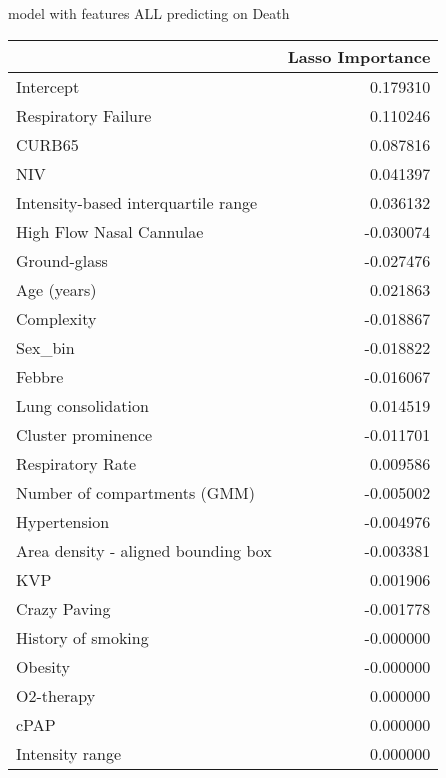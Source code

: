 model with features ALL predicting on Death\newline
\begin{tabular}{lr}
\toprule
{} &  Lasso Importance \\
\midrule
Intercept                           &          0.179310 \\
Respiratory Failure                 &          0.110246 \\
CURB65                              &          0.087816 \\
NIV                                 &          0.041397 \\
Intensity-based interquartile range &          0.036132 \\
High Flow Nasal Cannulae            &         -0.030074 \\
Ground-glass                        &         -0.027476 \\
Age (years)                         &          0.021863 \\
Complexity                          &         -0.018867 \\
Sex\_bin                             &         -0.018822 \\
Febbre                              &         -0.016067 \\
Lung consolidation                  &          0.014519 \\
Cluster prominence                  &         -0.011701 \\
Respiratory Rate                    &          0.009586 \\
Number of compartments (GMM)        &         -0.005002 \\
Hypertension                        &         -0.004976 \\
Area density - aligned bounding box &         -0.003381 \\
KVP                                 &          0.001906 \\
Crazy Paving                        &         -0.001778 \\
History of smoking                  &         -0.000000 \\
Obesity                             &         -0.000000 \\
O2-therapy                          &          0.000000 \\
cPAP                                &          0.000000 \\
Intensity range                     &          0.000000 \\

\end{tabular}
